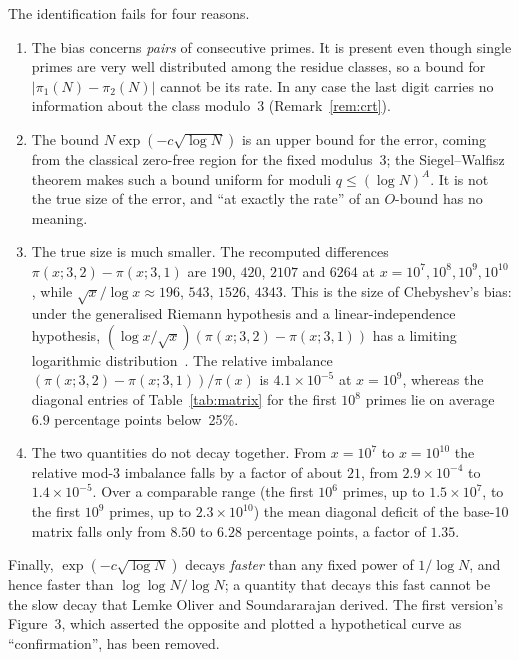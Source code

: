 \documentclass[12pt,a4paper]{article}
\theoremstyle{plain}
\theoremstyle{definition}
\theoremstyle{remark}
\begin{document}
The identification fails for four reasons.

\begin{enumerate}[label=(\alph*)]
  \item The bias concerns \emph{pairs} of consecutive primes. It is present even though
    single primes are very well distributed among the residue classes, so a bound for
    $|\pi_1(N) - \pi_2(N)|$ cannot be its rate. In any case the last digit carries no
    information about the class modulo~3 (Remark~\ref{rem:crt}).
  \item The bound $N\exp(-c\sqrt{\log N})$ is an upper bound for the error, coming from the
    classical zero-free region for the fixed modulus~3; the Siegel--Walfi{}sz theorem
    \cite{Wal36} makes such a bound uniform for moduli $q \leq (\log N)^A$. It is not the
    true size of the error, and ``at exactly the rate'' of an $O$-bound has no meaning.
  \item The true size is much smaller. The recomputed differences
    $\pi(x;3,2) - \pi(x;3,1)$ are $190$, $420$, $2107$ and $6264$ at
    $x = 10^7, 10^8, 10^9, 10^{10}$, while $\sqrt{x}/\log x \approx 196$, $543$, $1526$,
    $4343$. This is the size of Chebyshev's bias: under the generalised Riemann
    hypothesis and a linear-independence hypothesis,
    $(\log x/\sqrt{x})(\pi(x;3,2) - \pi(x;3,1))$ has a limiting logarithmic
    distribution~\cite{RS94}. The relative imbalance
    $(\pi(x;3,2) - \pi(x;3,1))/\pi(x)$ is $4.1 \times 10^{-5}$ at $x = 10^9$, whereas the
    diagonal entries of Table~\ref{tab:matrix} for the first $10^8$ primes lie on average
    $6.9$ percentage points below~25\%.
  \item The two quantities do not decay together. From $x = 10^7$ to $x = 10^{10}$ the
    relative mod-3 imbalance falls by a factor of about $21$, from $2.9 \times 10^{-4}$ to
    $1.4 \times 10^{-5}$. Over a comparable range (the first $10^6$ primes, up to
    $1.5 \times 10^7$, to the first $10^9$ primes, up to $2.3 \times 10^{10}$) the mean
    diagonal deficit of the base-10 matrix falls only from $8.50$ to $6.28$ percentage
    points, a factor of $1.35$.
\end{enumerate}

Finally, $\exp(-c\sqrt{\log N})$ decays \emph{faster} than any fixed power of
$1/\log N$, and hence faster than $\log\log N/\log N$; a quantity that decays this fast
cannot be the slow decay that Lemke Oliver and Soundararajan derived. The first
version's Figure~3,
which asserted the opposite and plotted a hypothetical curve as ``confirmation'', has been
removed.
\end{document}
